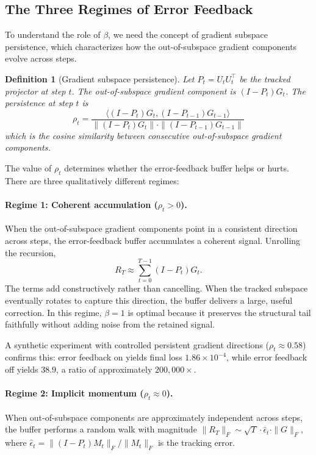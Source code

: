 \documentclass[11pt]{article}
\newcommand{\norm}[1]{\|#1\|}
\newcommand{\inner}[2]{\langle #1, #2 \rangle}
\newtheorem{definition}{Definition}
\begin{document}
\subsection{The Three Regimes of Error Feedback}
\label{sec:three_regimes}

To understand the role of $\beta$, we need the concept of gradient subspace persistence, which characterizes how the out-of-subspace gradient components evolve across steps.

\begin{definition}[Gradient subspace persistence]
Let $P_t = U_t U_t^\top$ be the tracked projector at step $t$. The out-of-subspace gradient component is $(I - P_t) G_t$. The persistence at step $t$ is
\[
\rho_t = \frac{\inner{(I-P_t)G_t}{(I-P_{t-1})G_{t-1}}}{\norm{(I-P_t)G_t} \cdot \norm{(I-P_{t-1})G_{t-1}}}
\]
which is the cosine similarity between consecutive out-of-subspace gradient components.
\end{definition}

The value of $\rho_t$ determines whether the error-feedback buffer helps or hurts. There are three qualitatively different regimes:

\paragraph{Regime 1: Coherent accumulation ($\rho_t > 0$).} When the out-of-subspace gradient components point in a consistent direction across steps, the error-feedback buffer accumulates a coherent signal. Unrolling the recursion,
\[
R_T \approx \sum_{t=0}^{T-1} (I - P_t) G_t.
\]
The terms add constructively rather than cancelling. When the tracked subspace eventually rotates to capture this direction, the buffer delivers a large, useful correction. In this regime, $\beta = 1$ is optimal because it preserves the structural tail faithfully without adding noise from the retained signal.

A synthetic experiment with controlled persistent gradient directions ($\rho_t \approx 0.58$) confirms this: error feedback on yields final loss $1.86 \times 10^{-4}$, while error feedback off yields $38.9$, a ratio of approximately $200{,}000\times$.

\paragraph{Regime 2: Implicit momentum ($\rho_t \approx 0$).} When out-of-subspace components are approximately independent across steps, the buffer performs a random walk with magnitude $\norm{R_T}_F \sim \sqrt{T} \cdot \hat{\epsilon}_t \cdot \norm{G}_F$, where $\hat{\epsilon}_t = \norm{(I-P_t)M_t}_F / \norm{M_t}_F$ is the tracking error.
\end{document}
